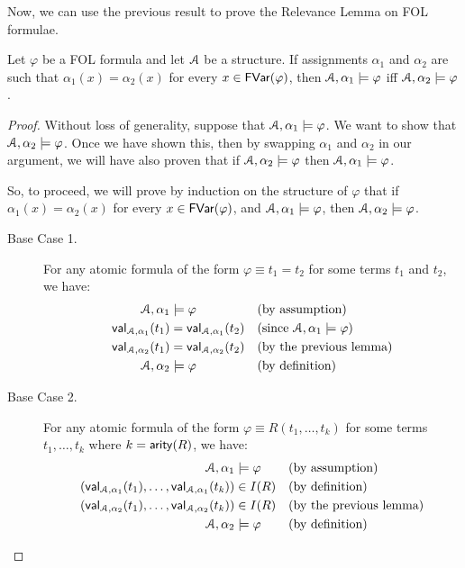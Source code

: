 \documentclass[11pt,usenames, dvipsnames]{article}
\begin{document}
Now, we can use the previous result to prove the Relevance Lemma on FOL formulae.

\begin{lemma}
  Let $\varphi$ be a FOL formula and let $\struct$ be a structure. If assignments $\alpha_1$ and $\alpha_2$ are such that $\alpha_1(x) = \alpha_2(x)$ for every $x \in \mathsf{FVar}(\varphi)$, then $\struct, \alpha_1 \models \varphi$ iff $\struct, \alpha_2 \models \varphi$.
\end{lemma}

\begin{proof}
  Without loss of generality, suppose that $\struct, \alpha_1 \models \varphi$. We want to show that $\struct, \alpha_2 \models \varphi$. Once we have shown this, then by swapping $\alpha_1$ and $\alpha_2$ in our argument, we will have also proven that if $\struct, \alpha_2 \models \varphi$ then $\struct, \alpha_1 \models \varphi$.

  So, to proceed, we will prove by induction on the structure of $\varphi$ that if $\alpha_1(x) = \alpha_2(x)$ for every $x \in \mathsf{FVar}(\varphi)$, and $\struct, \alpha_1 \models \varphi$, then $\struct, \alpha_2 \models \varphi$.

  \begin{description}
    \item[Base Case 1.] For any atomic formula of the form $\varphi \equiv t_1 = t_2$ for some terms $t_1$ and $t_2$, we have:
    \begin{align*}
      \struct, \alpha_1 &\models \varphi &&\text{(by assumption)}
      \\
      \val{\struct, \alpha_1}{t_1} &= \val{\struct, \alpha_1}{t_2} &&\text{(since $\struct, \alpha_1 \models \varphi$)}
      \\
      \val{\struct, \alpha_2}{t_1} &= \val{\struct, \alpha_2}{t_2} &&\text{(by the previous lemma)}
      \\
      \struct, \alpha_2 &\models \varphi &&\text{(by definition)}
    \end{align*}

    \item[Base Case 2.] For any atomic formula of the form $\varphi \equiv R(t_1, \ldots, t_k)$ for some terms $t_1, \ldots, t_k$ where $k = \mathsf{arity}(R)$, we have:
    \begin{align*}
      \struct, \alpha_1 &\models \varphi &&\text{(by assumption)}
      \\
      (\val{\struct, \alpha_1}{t_1}, \ldots, \val{\struct, \alpha_1}{t_k}) &\in I(R) &&\text{(by definition)}
      \\
      (\val{\struct, \alpha_2}{t_1}, \ldots, \val{\struct, \alpha_2}{t_k}) &\in I(R) &&\text{(by the previous lemma)}
      \\
      \struct, \alpha_2 &\models \varphi &&\text{(by definition)}
    \end{align*}


\end{description}
\end{proof}
\end{document}
